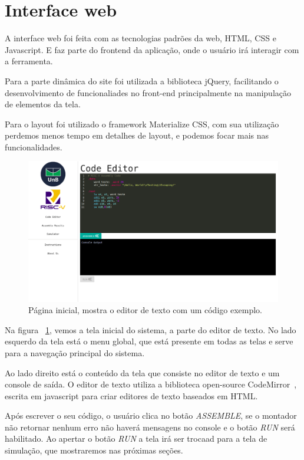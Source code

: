 \section{Interface web}

	A interface web foi feita com as tecnologias padrões da web, HTML, CSS e Javascript. E faz parte do frontend da aplicação, onde o usuário irá interagir com a ferramenta. 

	Para a parte dinâmica do site foi utilizada a biblioteca jQuery, facilitando o desenvolvimento de funcionaliades no front-end principalmente na manipulação de elementos da tela. 

	Para o layout foi utilizado o framework Materialize CSS, com sua utilização perdemos menos tempo em detalhes de layout, e podemos focar mais nas funcionalidades.

	\begin{figure}[h]
	  \includegraphics[width=\linewidth]{img/code_editor.png}
	  \caption{Página inicial, mostra o editor de texto com um código exemplo.}
	  \label{fig:editor_texto}
	\end{figure}

	Na figura ~\ref{fig:editor_texto}, vemos a tela inicial do sistema, a parte do editor de texto. No lado esquerdo da tela está o menu global, que está presente em todas as telas e serve para a navegação principal do sistema.

	Ao lado direito está o conteúdo da tela que consiste no editor de texto e um console de saída. O editor de texto utiliza a biblioteca open-source CodeMirror~\cite{codemirror}, escrita em javascript para criar editores de texto baseados em HTML.

	Após escrever o seu código, o usuário clica no botão \textit{ASSEMBLE}, se o montador não retornar nenhum erro não haverá mensagens no console e o botão \textit{RUN} será habilitado. Ao apertar o botão \textit{RUN} a tela irá ser trocaad para a tela de simulação, que mostraremos nas próximas seções.

